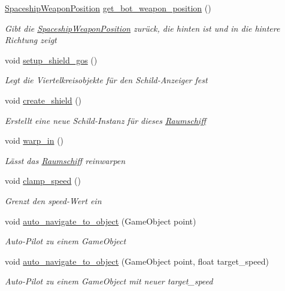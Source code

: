 \begin{DoxyCompactItemize}
\hyperlink{class_spaceship_weapon_position}{Spaceship\+Weapon\+Position} \hyperlink{class_spaceship_a35fbba50c658617e939fd2d82bf33fbf}{get\+\_\+bot\+\_\+weapon\+\_\+position} ()
\begin{DoxyCompactList}\small\item\em Gibt die \hyperlink{class_spaceship_weapon_position}{Spaceship\+Weapon\+Position} zurück, die hinten ist und in die hintere Richtung zeigt \end{DoxyCompactList}\item 
void \hyperlink{class_spaceship_a18e0ef162384544259aa3ec4f55ad5f8}{setup\+\_\+shield\+\_\+gos} ()
\begin{DoxyCompactList}\small\item\em Legt die Viertelkreisobjekte für den Schild-\/\+Anzeiger fest \end{DoxyCompactList}\item 
void \hyperlink{class_spaceship_a686609169faa9dec55c5da096581beec}{create\+\_\+shield} ()
\begin{DoxyCompactList}\small\item\em Erstellt eine neue Schild-\/\+Instanz für dieses \hyperlink{class_raumschiff}{Raumschiff} \end{DoxyCompactList}\item 
void \hyperlink{class_spaceship_a4a932f067ed922c34f82fa4479dbdf4d}{warp\+\_\+in} ()
\begin{DoxyCompactList}\small\item\em Lässt das \hyperlink{class_raumschiff}{Raumschiff} reinwarpen \end{DoxyCompactList}\item 
void \hyperlink{class_spaceship_a2e51bf3ac0ada83d93bb8a474994a210}{clamp\+\_\+speed} ()
\begin{DoxyCompactList}\small\item\em Grenzt den speed-\/\+Wert ein \end{DoxyCompactList}\item 
void \hyperlink{class_spaceship_a311d0678e160eb4115fcc756f4ca1bfb}{auto\+\_\+navigate\+\_\+to\+\_\+object} (Game\+Object point)
\begin{DoxyCompactList}\small\item\em Auto-\/\+Pilot zu einem Game\+Object \end{DoxyCompactList}\item 
void \hyperlink{class_spaceship_a9e01091d877ec35797334f53e1a6faa6}{auto\+\_\+navigate\+\_\+to\+\_\+object} (Game\+Object point, float target\+\_\+speed)
\begin{DoxyCompactList}\small\item\em Auto-\/\+Pilot zu einem Game\+Object mit neuer target\+\_\+speed \end{DoxyCompactList}\item 

\end{DoxyCompactItemize}
